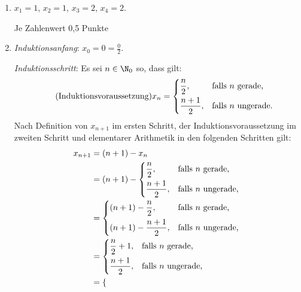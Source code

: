 \documentclass[12pt]{article}
\begin{document}
\begin{loesung}
  \begin{enumerate}
    \item $x_1 = 1$, $x_2 = 1$, $x_3 = 2$, $x_4 = 2$.
          \begin{korrektur}
            Je Zahlenwert 0,5 Punkte
          \end{korrektur}
    \item \emph{Induktionsanfang}: $x_0 = 0 = \frac{0}{2}$.

          \emph{Induktionsschritt}: Es sei $n \in \N_0$ so, dass gilt:
          \begin{equation}\tag{Induktionsvoraussetzung}
            x_n = \begin{dcases*}
                    \frac{n}{2},     &falls $n$ gerade,\\
                    \frac{n + 1}{2}, &falls $n$ ungerade.
                  \end{dcases*}
          \end{equation}
          Nach Definition von $x_{n + 1}$ im ersten Schritt, der Induktionsvoraussetzung im zweiten Schritt und elementarer Arithmetik in den folgenden Schritten gilt:
          \begin{align*}
            x_{n + 1} &= (n + 1) - x_n\\
                      &= (n + 1) - \begin{dcases*}
                                     \frac{n}{2},     &falls $n$ gerade,\\
                                     \frac{n + 1}{2}, &falls $n$ ungerade,
                                   \end{dcases*}\\
                      &= \begin{dcases*}
                           (n + 1) - \frac{n}{2},     &falls $n$ gerade,\\
                           (n + 1) - \frac{n + 1}{2}, &falls $n$ ungerade,
                         \end{dcases*}\\
                      &= \begin{dcases*}
                           \frac{n}{2} + 1, &falls $n$ gerade,\\
                           \frac{n + 1}{2}, &falls $n$ ungerade,
                         \end{dcases*}\\
                      &= \begin{dcases*}

\end{dcases*}
\end{align*}
\end{enumerate}
\end{loesung}
\end{document}
